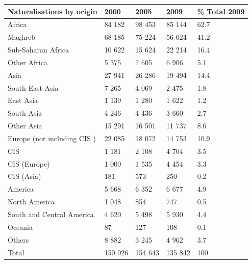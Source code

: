 \documentclass{article}
\begin{document}
\begin{tabular}{lllll}
\toprule
Naturalisations by origin & 2000 & 2005 & 2009 & \% Total 2009 \\
\midrule
Africa & 84 182 & 98 453 & 85 144 & 62.7 \\
Maghreb & 68 185 & 75 224 & 56 024 & 41.2 \\
Sub-Saharan Africa & 10 622 & 15 624 & 22 214 & 16.4 \\
Other Africa & 5 375 & 7 605 & 6 906 & 5.1 \\
Asia & 27 941 & 26 286 & 19 494 & 14.4 \\
South-East Asia & 7 265 & 4 069 & 2 475 & 1.8 \\
East Asia & 1 139 & 1 280 & 1 622 & 1.2 \\
South Asia & 4 246 & 4 436 & 3 660 & 2.7 \\
Other Asia & 15 291 & 16 501 & 11 737 & 8.6 \\
Europe (not including CIS ) & 22 085 & 18 072 & 14 753 & 10.9 \\
CIS & 1 181 & 2 108 & 4 704 & 3.5 \\
CIS (Europe) & 1 000 & 1 535 & 4 454 & 3.3 \\
CIS (Asia) & 181 & 573 & 250 & 0.2 \\
America & 5 668 & 6 352 & 6 677 & 4.9 \\
North America & 1 048 & 854 & 747 & 0.5 \\
South and Central America & 4 620 & 5 498 & 5 930 & 4.4 \\
Oceania & 87 & 127 & 108 & 0.1 \\
Others & 8 882 & 3 245 & 4 962 & 3.7 \\
Total & 150 026 & 154 643 & 135 842 & 100 \\
\bottomrule
\end{tabular}
\end{document}
